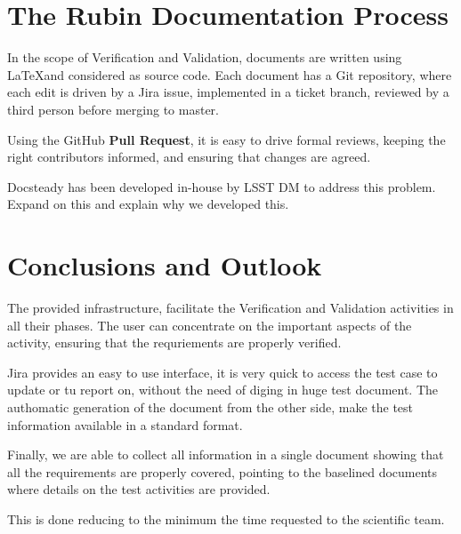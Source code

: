 \section{The Rubin Documentation Process}

In the scope of Verification and Validation, documents are written using \LaTeX and considered as source code.
Each document has a Git repository, where each edit is driven by a Jira issue, implemented in a ticket branch, 
reviewed by a third person before merging to master.

Using the GitHub \textbf{Pull Request}, it is easy to drive formal reviews, keeping the right contributors informed,
and ensuring that changes are agreed.

Docsteady has been developed in-house by LSST DM to address this problem. Expand on this and explain why 
we developed this. 



\section{Conclusions and Outlook}

The provided infrastructure, facilitate the Verification and Validation activities in all their phases.
The user can concentrate on the important aspects of the activity, ensuring that the requriements are properly verified.

Jira provides an easy to use interface, it is very quick to access the test case to update or tu report on, without the need of diging in huge test document.
The authomatic generation of the document from the other side, make the test information available in a standard format.

Finally, we are able to collect all information in a single document showing that all the requirements are properly covered,
pointing to the baselined documents where details on the test activities are provided.

This is done reducing to the minimum the time requested to the scientific team.



